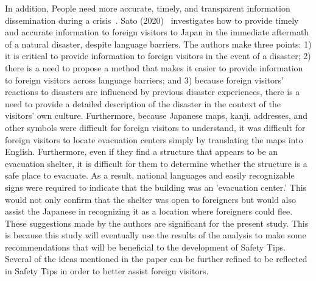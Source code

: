 In addition, People need more accurate, timely, and transparent information dissemination during a crisis~\cite{ref49}. Sato (2020)~\cite{ref8}  investigates how to provide timely and accurate information to foreign visitors to Japan in the immediate aftermath of a natural disaster, despite language barriers. The authors make three points: 1) it is critical to provide information to foreign visitors in the event of a disaster; 2) there is a need to propose a method that makes it easier to provide information to foreign visitors across language barriers; and 3) because foreign visitors' reactions to disasters are influenced by previous disaster experiences, there is a need to provide a detailed description of the disaster in the context of the visitors' own culture. Furthermore, because Japanese maps, kanji, addresses, and other symbols were difficult for foreign visitors to understand, it was difficult for foreign visitors to locate evacuation centers simply by translating the maps into English. Furthermore, even if they find a structure that appears to be an evacuation shelter, it is difficult for them to determine whether the structure is a safe place to evacuate. As a result, national languages and easily recognizable signs were required to indicate that the building was an 'evacuation center.' This would not only confirm that the shelter was open to foreigners but would also assist the Japanese in recognizing it as a location where foreigners could flee. These suggestions made by the authors are significant for the present study. This is because this study will eventually use the results of the analysis to make some recommendations that will be beneficial to the development of Safety Tips. Several of the ideas mentioned in the paper can be further refined to be reflected in Safety Tips in order to better assist foreign visitors.


